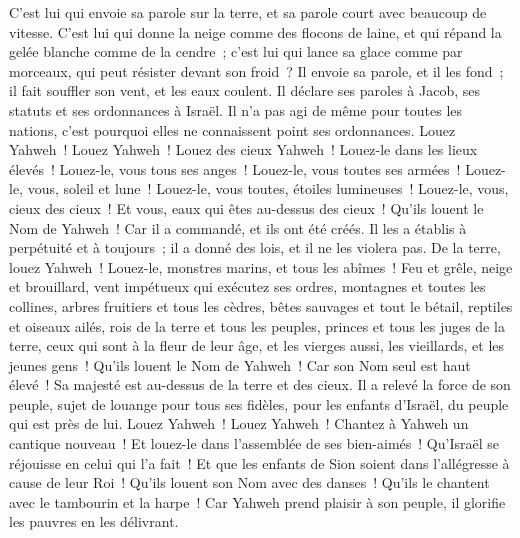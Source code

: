 \begin{multicols}{2}
C'est lui qui envoie sa parole sur la terre, et sa parole court avec beaucoup de vitesse.
C'est lui qui donne la neige comme des flocons de laine, et qui répand la gelée blanche comme de la cendre~;
c'est lui qui lance sa glace comme par morceaux, qui peut résister devant son froid~?
Il envoie sa parole, et il les fond~; il fait souffler son vent, et les eaux coulent.
Il déclare ses paroles à Jacob, ses statuts et ses ordonnances à Israël.
Il n'a pas agi de même pour toutes les nations, c'est pourquoi elles ne connaissent point ses ordonnances. Louez Yahweh~!
\VerseOne{}Louez Yahweh~! Louez des cieux Yahweh~! Louez-le dans les lieux élevés~!
Louez-le, vous tous ses anges~! Louez-le, vous toutes ses armées~!
Louez-le, vous, soleil et lune~! Louez-le, vous toutes, étoiles lumineuses~!
Louez-le, vous, cieux des cieux~! Et vous, eaux qui êtes au-dessus des cieux~!
Qu'ils louent le Nom de Yahweh~! Car il a commandé, et ils ont été créés.
Il les a établis à perpétuité et à toujours~; il a donné des lois, et il ne les violera pas.
De la terre, louez Yahweh~! Louez-le, monstres marins, et tous les abîmes~!
Feu et grêle, neige et brouillard, vent impétueux qui exécutez ses ordres,
montagnes et toutes les collines, arbres fruitiers et tous les cèdres,
bêtes sauvages et tout le bétail, reptiles et oiseaux ailés,
rois de la terre et tous les peuples, princes et tous les juges de la terre,
ceux qui sont à la fleur de leur âge, et les vierges aussi, les vieillards, et les jeunes gens~!
Qu'ils louent le Nom de Yahweh~! Car son Nom seul est haut élevé~! Sa majesté est au-dessus de la terre et des cieux.
Il a relevé la force de son peuple, sujet de louange pour tous ses fidèles, pour les enfants d'Israël, du peuple qui est près de lui. Louez Yahweh~!
\VerseOne{}Louez Yahweh~! Chantez à Yahweh un cantique nouveau~! Et louez-le dans l'assemblée de ses bien-aimés~!
Qu'Israël se réjouisse en celui qui l'a fait~! Et que les enfants de Sion soient dans l'allégresse à cause de leur Roi~!
Qu'ils louent son Nom avec des danses~! Qu'ils le chantent avec le tambourin et la harpe~!
Car Yahweh prend plaisir à son peuple, il glorifie les pauvres en les délivrant.

\end{multicols}
